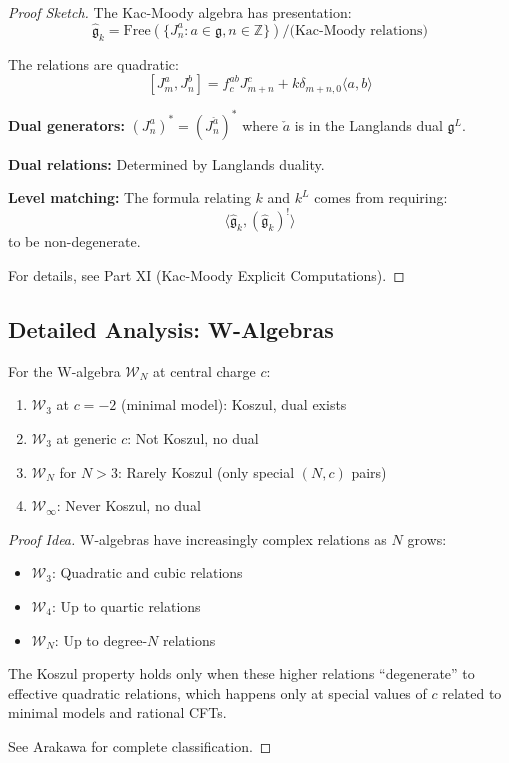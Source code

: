 \begin{proof}[Proof Sketch]
The Kac-Moody algebra has presentation:
$$\widehat{\mathfrak{g}}_k = \text{Free}(\{J^a_n : a \in \mathfrak{g}, n \in \mathbb{Z}\}) 
/ \text{(Kac-Moody relations)}$$

The relations are quadratic:
$$[J^a_m, J^b_n] = f^{ab}_c J^c_{m+n} + k \delta_{m+n,0} \langle a, b \rangle$$

\textbf{Dual generators:} $(J^a_n)^* = (J^{\check{a}}_n)^*$ where $\check{a}$ is in 
the Langlands dual $\mathfrak{g}^L$.

\textbf{Dual relations:} Determined by Langlands duality.

\textbf{Level matching:} The formula relating $k$ and $k^L$ comes from requiring:
$$\langle \widehat{\mathfrak{g}}_k, (\widehat{\mathfrak{g}}_k)^! \rangle$$
to be non-degenerate.

For details, see Part XI (Kac-Moody Explicit Computations).
\end{proof}

\subsection{Detailed Analysis: W-Algebras}

\begin{proposition}\label{prop:w-algebra-koszul}
For the W-algebra $\mathcal{W}_N$ at central charge $c$:
\begin{enumerate}
\item $\mathcal{W}_3$ at $c = -2$ (minimal model): Koszul, dual exists
\item $\mathcal{W}_3$ at generic $c$: Not Koszul, no dual
\item $\mathcal{W}_N$ for $N > 3$: Rarely Koszul (only special $(N, c)$ pairs)
\item $\mathcal{W}_\infty$: Never Koszul, no dual
\end{enumerate}
\end{proposition}

\begin{proof}[Proof Idea]
W-algebras have increasingly complex relations as $N$ grows:
\begin{itemize}
\item $\mathcal{W}_3$: Quadratic and cubic relations
\item $\mathcal{W}_4$: Up to quartic relations
\item $\mathcal{W}_N$: Up to degree-$N$ relations
\end{itemize}

The Koszul property holds only when these higher relations ``degenerate'' to effective 
quadratic relations, which happens only at special values of $c$ related to minimal 
models and rational CFTs.

See Arakawa \cite{Ara07} for complete classification.
\end{proof}

